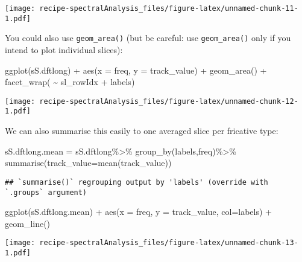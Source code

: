 \documentclass[
]{book}
\newenvironment{Shaded}{\begin{snugshade}}{\end{snugshade}}
\newcommand{\AttributeTok}[1]{\textcolor[rgb]{0.77,0.63,0.00}{#1}}
\newcommand{\FunctionTok}[1]{\textcolor[rgb]{0.00,0.00,0.00}{#1}}
\newcommand{\NormalTok}[1]{#1}
\newcommand{\OtherTok}[1]{\textcolor[rgb]{0.56,0.35,0.01}{#1}}
\newcommand{\SpecialCharTok}[1]{\textcolor[rgb]{0.00,0.00,0.00}{#1}}
\begin{document}
\texttt{[image: recipe-spectralAnalysis\_files/figure-latex/unnamed-chunk-11-1.pdf]}

You could also use \texttt{geom\_area()} (but be careful: use \texttt{geom\_area()} only if you intend to plot individual slices):

\begin{Shaded}
\begin{Highlighting}[]
\FunctionTok{ggplot}\NormalTok{(sS.dftlong) }\SpecialCharTok{+}
  \FunctionTok{aes}\NormalTok{(}\AttributeTok{x =}\NormalTok{ freq, }\AttributeTok{y =}\NormalTok{ track\_value) }\SpecialCharTok{+}
  \FunctionTok{geom\_area}\NormalTok{() }\SpecialCharTok{+}
  \FunctionTok{facet\_wrap}\NormalTok{( }\SpecialCharTok{\textasciitilde{}}\NormalTok{ sl\_rowIdx }\SpecialCharTok{+}\NormalTok{ labels)}
\end{Highlighting}
\end{Shaded}

\texttt{[image: recipe-spectralAnalysis\_files/figure-latex/unnamed-chunk-12-1.pdf]}

We can also summarise this easily to one averaged slice per fricative type:

\begin{Shaded}
\begin{Highlighting}[]
\NormalTok{sS.dftlong.mean }\OtherTok{=}\NormalTok{ sS.dftlong}\SpecialCharTok{\%\textgreater{}\%}
  \FunctionTok{group\_by}\NormalTok{(labels,freq)}\SpecialCharTok{\%\textgreater{}\%}
  \FunctionTok{summarise}\NormalTok{(}\AttributeTok{track\_value=}\FunctionTok{mean}\NormalTok{(track\_value))}
\end{Highlighting}
\end{Shaded}

\begin{verbatim}
## `summarise()` regrouping output by 'labels' (override with `.groups` argument)
\end{verbatim}

\begin{Shaded}
\begin{Highlighting}[]
\FunctionTok{ggplot}\NormalTok{(sS.dftlong.mean) }\SpecialCharTok{+}
  \FunctionTok{aes}\NormalTok{(}\AttributeTok{x =}\NormalTok{ freq, }\AttributeTok{y =}\NormalTok{ track\_value, }\AttributeTok{col=}\NormalTok{labels) }\SpecialCharTok{+}
  \FunctionTok{geom\_line}\NormalTok{() }
\end{Highlighting}
\end{Shaded}

\texttt{[image: recipe-spectralAnalysis\_files/figure-latex/unnamed-chunk-13-1.pdf]}
\end{document}
